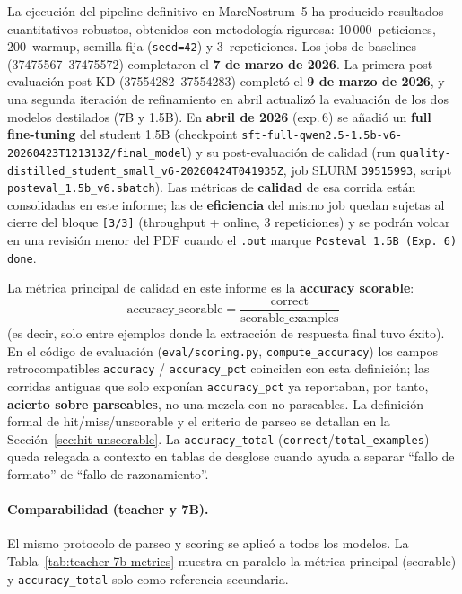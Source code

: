 \documentclass[11pt,a4paper]{article}
\begin{document}
La ejecuci\'on del pipeline definitivo en MareNostrum~5 ha producido
resultados cuantitativos robustos, obtenidos con metodolog\'ia rigurosa:
10\,000~peticiones, 200~warmup, semilla fija (\texttt{seed=42}) y
3~repeticiones. Los jobs de baselines (37475567--37475572) completaron
el \textbf{7 de marzo de 2026}. La primera post-evaluaci\'on post-KD
(37554282--37554283) complet\'o el \textbf{9 de marzo de 2026}, y una
segunda iteraci\'on de refinamiento en abril actualiz\'o la evaluaci\'on
de los dos modelos destilados (7B y 1.5B). En \textbf{abril de 2026}
(exp.\,6) se a\~nadi\'o un \textbf{full fine-tuning} del student 1.5B
(checkpoint \texttt{sft-full-qwen2.5-1.5b-v6-20260423T121313Z/final\_model})
y su post-evaluaci\'on de calidad (run
\texttt{quality-distilled\_student\_small\_v6-20260424T041935Z},
job SLURM \texttt{39515993}, script \texttt{posteval\_1.5b\_v6.sbatch}).
Las m\'etricas de \textbf{calidad} de esa corrida est\'an consolidadas en
este informe; las de \textbf{eficiencia} del mismo job quedan sujetas al
cierre del bloque \texttt{[3/3]} (throughput + online, 3 repeticiones) y se
podr\'an volcar en una revisi\'on menor del PDF cuando el \texttt{.out}
marque \texttt{Posteval 1.5B (Exp. 6) done}.

La m\'etrica principal de calidad en este informe es la
\textbf{accuracy scorable}:
\[
\text{accuracy\_scorable} = \frac{\text{correct}}{\text{scorable\_examples}}
\]
(es decir, solo entre ejemplos donde la extracci\'on de respuesta final
tuvo \'exito). En el c\'odigo de evaluaci\'on (\texttt{eval/scoring.py},
\texttt{compute\_accuracy}) los campos retrocompatibles
\texttt{accuracy} / \texttt{accuracy\_pct} coinciden con esta definici\'on;
las corridas antiguas que solo expon\'ian \texttt{accuracy\_pct} ya
reportaban, por tanto, \textbf{acierto sobre parseables}, no una mezcla
con no-parseables. La definici\'on formal de hit/miss/unscorable y el
criterio de parseo se detallan en la Secci\'on~\ref{sec:hit-unscorable}.
La \texttt{accuracy\_total} (\texttt{correct}/\texttt{total\_examples})
queda relegada a contexto en tablas de desglose cuando ayuda a separar
``fallo de formato'' de ``fallo de razonamiento''.

\paragraph{Comparabilidad (teacher y 7B).}
El mismo protocolo de parseo y scoring se aplic\'o a todos los modelos.
La Tabla~\ref{tab:teacher-7b-metrics} muestra en paralelo la m\'etrica
principal (scorable) y \texttt{accuracy\_total} solo como referencia
secundaria.
\end{document}
